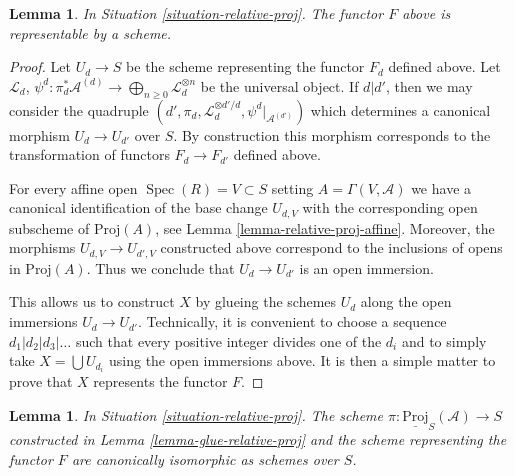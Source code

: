 \documentclass{stacks-project}
\theoremstyle{plain}
\newtheorem{lemma}[subsection]{Lemma}
\theoremstyle{definition}
\theoremstyle{remark}
\numberwithin{equation}{subsection}
\def\Spec{\mathop{\mathrm{Spec}}}
\begin{document}
\begin{lemma}
\label{lemma-relative-proj}
In Situation \ref{situation-relative-proj}.
The functor $F$ above is representable by a scheme.
\end{lemma}

\begin{proof}
Let $U_d \to S$ be the scheme representing the functor $F_d$
defined above. Let $\mathcal{L}_d$,
$\psi^d : \pi_d^*\mathcal{A}^{(d)} \to
\bigoplus_{n \geq 0} \mathcal{L}_d^{\otimes n}$ be the universal object.
If $d | d'$, then we may consider the quadruple
$(d', \pi_d, \mathcal{L}_d^{\otimes d'/d}, \psi^d|_{\mathcal{A}^{(d')}})$
which determines a canonical morphism $U_d \to U_{d'}$ over $S$.
By construction this morphism corresponds to the transformation
of functors $F_d \to F_{d'}$ defined above.

\medskip\noindent
For every affine open $\Spec(R) = V \subset S$
setting $A = \Gamma(V, \mathcal{A})$ we have a canonical
identification of the base change $U_{d, V}$ with the corresponding open
subscheme of $\text{Proj}(A)$, see Lemma \ref{lemma-relative-proj-affine}.
Moreover, the morphisms $U_{d, V} \to U_{d', V}$ constructed above
correspond to the inclusions of opens in $\text{Proj}(A)$.
Thus we conclude that $U_d \to U_{d'}$ is an open immersion.

\medskip\noindent
This allows us to construct $X$
by glueing the schemes $U_d$ along the open immersions $U_d \to U_{d'}$.
Technically, it is convenient to choose a sequence
$d_1 | d_2 | d_3 | \ldots$ such that every positive integer
divides one of the $d_i$ and to simply take
$X = \bigcup U_{d_i}$ using the open immersions above.
It is then a simple matter to prove that $X$ represents the
functor $F$.
\end{proof}

\begin{lemma}
\label{lemma-glueing-gives-functor-proj}
In Situation \ref{situation-relative-proj}.
The scheme $\pi : \underline{\text{Proj}}_S(\mathcal{A}) \to S$
constructed in Lemma \ref{lemma-glue-relative-proj}
and the scheme representing the functor $F$
are canonically isomorphic as schemes over $S$.
\end{lemma}
\end{document}
